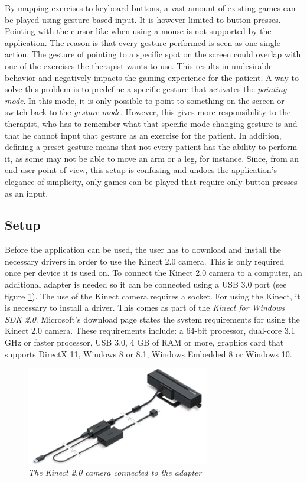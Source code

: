By mapping exercises to keyboard buttons, a vast amount of existing games can be played using gesture-based input. It is however limited to button presses. Pointing with the cursor like when using a mouse is not supported by the application. The reason is that every gesture performed is seen as one single action. The gesture of pointing to a specific spot on the screen could overlap with one of the exercises the therapist wants to use. This results in undesirable behavior and negatively impacts the gaming experience for the patient. A way to solve this problem is to predefine a specific gesture that activates the \emph{pointing mode}. In this mode, it is only possible to point to something on the screen or switch back to the \emph{gesture mode}. However, this gives more responsibility to the therapist, who has to remember what that specific mode changing gesture is and that he cannot input that gesture as an exercise for the patient. In addition, defining a preset gesture means that not every patient has the ability to perform it, as some may not be able to move an arm or a leg, for instance. Since, from an end-user point-of-view, this setup is confusing and undoes the application's elegance of simplicity, only games can be played that require only button presses as an input.\\


\subsection{Setup}

Before the application can be used, the user has to download and install the necessary drivers in order to use the Kinect 2.0 camera. This is only required once per device it is used on. To connect the Kinect 2.0 camera to a computer, an additional adapter is needed so it can be connected using a USB 3.0 port (see figure \ref{fig: kinect}). The use of the Kinect camera requires a socket. For using the Kinect, it is necessary to install a driver. This comes as part of the \emph{Kinect for Windows SDK 2.0}. Microsoft's download page \cite{KinectSDK} states the system requirements for using the Kinect 2.0 camera. These requirements include: a 64-bit processor, dual-core 3.1 GHz or faster processor, USB 3.0, 4 GB of RAM or more, graphics card that supports DirectX 11, Windows 8 or 8.1, Windows Embedded 8 or Windows 10.\\

\begin{figure}[H]
\begin{center}
\includegraphics[width=8cm]{KinectAdapter.png}
\caption{\emph{The Kinect 2.0 camera connected to the adapter}}
\label{fig: kinect}
\end{center}
\end{figure}

